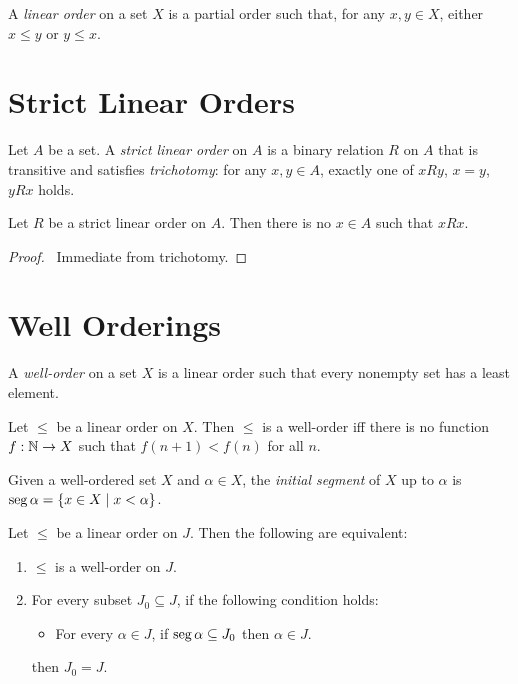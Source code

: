 \begin{definition}
    A \emph{linear order} on a set $X$ is a partial order such that, for any $x, y \in X$, either $x \leq y$ or $y \leq x$.
\end{definition}

\section{Strict Linear Orders}

\begin{definition}
    Let $A$ be a set. A \emph{strict linear order} on $A$ is a binary relation
    $R$ on $A$ that is transitive and satisfies \emph{trichotomy}: for any
    $x, y \in A$, exactly one of $xRy$, $x=y$, $yRx$ holds.
\end{definition}

\begin{theorem}
    Let $R$ be a strict linear order on $A$. Then there is no $x \in A$
    such that $xRx$.
\end{theorem}

\begin{proof}
    \pf\ Immediate from trichotomy.
\end{proof}

\section{Well Orderings}

\begin{definition}
    A \emph{well-order} on a set $X$ is a linear order such that every nonempty set has a least element.
\end{definition}

\begin{proposition}
    Let $\leq$ be a linear order on $X$. Then $\leq$ is a well-order iff there is no
    function $f : \mathbb{N} \rightarrow X$ such that $f(n+1) < f(n)$ for all $n$.    
\end{proposition}

\begin{definition}
    Given a well-ordered set $X$ and $\alpha \in X$, the \emph{initial segment}
    of $X$ up to $\alpha$ is $\operatorname{seg} \alpha = \{ x \in X \mid x < \alpha \}$.
\end{definition}

\begin{theorem}
    Let $\leq$ be a linear order on $J$. Then the following are equivalent:
    \begin{enumerate}
        \item $\leq$ is a well-order on $J$.
        \item For every subset $J_0 \subseteq J$, if the following condition holds:
        \begin{itemize}
            \item For every $\alpha \in J$, if $\operatorname{seg} \alpha \subseteq J_0$ then $\alpha \in J$.
        \end{itemize}
        then $J_0 = J$.
    \end{enumerate}
\end{theorem}

